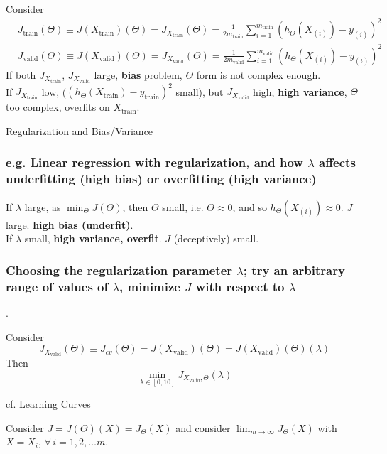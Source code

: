\documentclass[10pt]{amsart}
\begin{document}
\begin{multicols*}{2}
Consider 
\[
\begin{aligned}
	& J_{\text{train}}(\Theta) \equiv  J(X_{\text{train}})(\Theta) = J_{X_{\text{train}}}(\Theta) = \frac{1}{2m_{\text{train}}} \sum_{i=1}^{m_{\text{train}} } (h_{\Theta}(X_{(i)}) -y_{(i)} )^2 \\ 
	& J_{\text{valid}}(\Theta) \equiv  J(X_{\text{valid}})(\Theta) = J_{X_{\text{valid}}}(\Theta) = \frac{1}{2m_{\text{valid}}} \sum_{i=1}^{m_{\text{valid}} } (h_{\Theta}(X_{(i)}) -y_{(i)} )^2 
\end{aligned}
\]
If both $J_{X_{\text{train}}}$, $J_{X_{\text{valid}}}$ large, \textbf{bias} problem, $\Theta$ form is not complex enough.  \\
If $J_{X_{\text{train}}}$ low, ($(h_{\Theta}(X_{\text{train}}) -y_{\text{train}})^2$ small), but $J_{X_{\text{valid}}}$ high, \textbf{high variance}, $\Theta$ too complex, overfits on $X_{\text{train}}$.  

\href{https://www.coursera.org/learn/machine-learning/lecture/4VDlf/regularization-and-bias-variance}{Regularization and Bias/Variance}  

\subsubsection{e.g. Linear regression with regularization, and how $\lambda$ affects underfitting (high bias) or overfitting (high variance)}

If $\lambda$ large, as $\min_{\Theta} J(\Theta)$, then $\Theta$ small, i.e. $\Theta \approx 0$, and so $h_{\Theta}(X_{(i)}) \approx 0$.  $J$ large.  \textbf{high bias (underfit)}.  \\
If $\lambda$ small, \textbf{high variance, overfit}.  $J$ (deceptively) small.  

\subsubsection{Choosing the regularization parameter $\lambda$; try an arbitrary range of values of $\lambda$, minimize $J$ with respect to $\lambda$}.  

Consider
\[
J_{X_{\text{valid}}}(\Theta) \equiv J_{cv}(\Theta) = J(X_{\text{valid}})(\Theta) = J(X_{\text{valid}})(\Theta)(\lambda)
\]
Then 
\[
\min_{\lambda \in [0,10] }J_{X_{\text{valid}},\Theta}(\lambda)
\]

cf. \href{https://www.coursera.org/learn/machine-learning/lecture/Kont7/learning-curves}{Learning Curves}

Consider $J=J(\Theta)(X) = J_{\Theta}(X)$ and consider $\lim_{m\to \infty} J_{\Theta}(X)$ with $X= X_i$, $\forall \, i =1,2,\dots m$.  


\end{multicols*}
\end{document}
